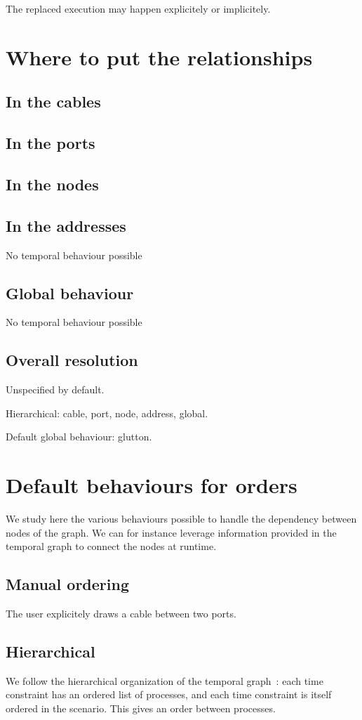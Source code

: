 \documentclass{article}
\begin{document}
    The replaced execution may happen explicitely or implicitely.
    
    \section{Where to put the relationships}
    \subsection{In the cables}
    \subsection{In the ports}
    \subsection{In the nodes}
    \subsection{In the addresses}
    No temporal behaviour possible
    \subsection{Global behaviour}
    No temporal behaviour possible
    \subsection{Overall resolution}
    Unspecified by default. 
    
    Hierarchical: cable, port, node, address, global.
    
    Default global behaviour: glutton.
    
  
    \section{Default behaviours for orders}
    We study here the various behaviours possible to handle the dependency between nodes of the graph. 
    We can for instance leverage information provided in the temporal graph to connect the nodes at runtime. 
    
    \subsection{Manual ordering}
    The user explicitely draws a cable between two ports.
    
    \subsection{Hierarchical}
    We follow the hierarchical organization of the temporal graph~: each time constraint has an ordered list of processes, and each time constraint is itself ordered in the scenario. This gives an order between processes.
    
\end{document}
